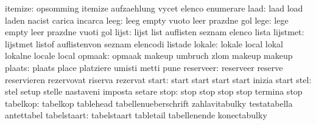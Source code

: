                   itemize: opsomming                 itemize
                           aufzaehlung               vycet
                           elenco                    enumerare
                     laad: laad                      load
                           laden                     nacist
                           carica                    incarca
                     leeg: leeg                      empty
                           vuoto                     leer
                           prazdne                   gol
                     lege: lege                      empty
                           leer                      prazdne
                           vuoti                     gol
                    lijst: lijst                     list
                           auflisten                 seznam
                           elenco                    lista
                 lijstmet: lijstmet                  listof
                           auflistenvon              seznam
                           elencodi                  listade
                   lokale: lokale                    local
                           lokal                     lokalne
                           locale                    local
                   opmaak: opmaak                    makeup
                           umbruch                   zlom
                           makeup                    makeup %
                   plaats: plaats                    place
                           platziere                 umisti
                           metti                     pune
                reserveer: reserveer                 reserve
                           reservieren               rezervovat
                           riserva                   rezervat
                    start: start                     start
                           start                     start
                           inizia                    start
                     stel: stel                      setup
                           stelle                    nastaveni
                           imposta                   setare
                     stop: stop                      stop
                           stop                      stop
                           termina                   stop
                 tabelkop: tabelkop                  tablehead
                           tabellenueberschrift      zahlavitabulky
                           testatabella              antettabel
              tabelstaart: tabelstaart               tabletail
                           tabellenende              konectabulky
